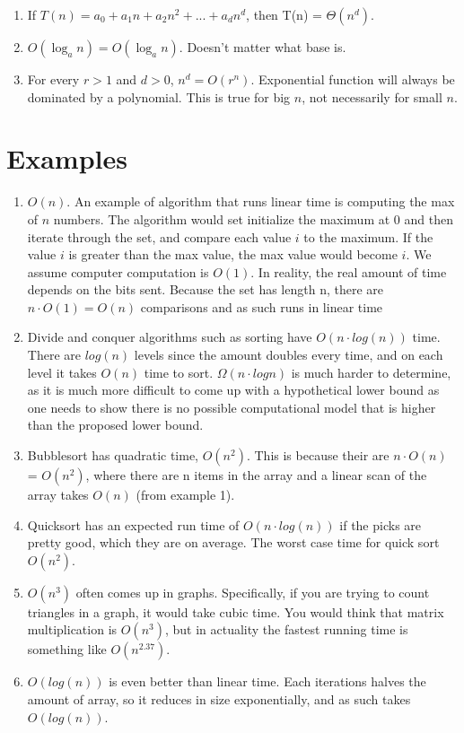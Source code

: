 \begin{enumerate}
  \item If $T(n)  = a_{0} + a_{1}n + a_{2}n^{2} + ... + a_{d}n^{d}$, then T(n) = $\Theta (n^{d})$.
  \item $O(\log_a n) = O(\log_a n)$. Doesn't matter what base is.
  \item For every $r>1$ and $d>0$, $n^{d} = O(r^{n})$. Exponential function will always be dominated by a polynomial. This is true for big $n$, not necessarily for small $n$.
\end{enumerate}

\section{Examples}


\begin{enumerate}
  \item $O(n)$. An example of algorithm that runs linear time is computing the max of $n$ numbers. The algorithm would set initialize the maximum at 0 and then iterate through the set, and compare each value $i$ to the maximum. If the value $i$ is greater than the max value, the max value would become $i$. We assume computer computation is $O(1)$. In reality, the real amount of time depends on the bits sent. Because the set has length n, there are $n \cdot O(1) = O(n)$ comparisons and as such runs in linear time
  
  \item Divide and conquer algorithms such as sorting have $O(n \cdot log (n))$ time. There are $log (n)$ levels since the amount doubles every time, and on each level it takes $O(n)$ time to sort. $\Omega(n \cdot log n)$ is much harder to determine, as it is much more difficult to come up with a hypothetical lower bound as one needs to show there is no possible computational model that is higher than the proposed lower bound.  
  
  \item Bubblesort has quadratic time, $O(n^{2})$. This is because their are $n \cdot O(n)$ = $O(n^{2})$, where there are n items in the array and a linear scan of the array takes $O(n)$ (from example 1). 
  
   \item Quicksort has an expected run time of $O(n \cdot log (n))$ if the picks are pretty good, which they are on average. The worst case time for quick sort  $O(n^{2})$.
   
   \item $O(n^{3})$ often comes up in graphs. Specifically, if you are trying to count triangles in a graph, it would take cubic time. You would think that matrix multiplication is $O(n^{3})$, but in actuality the fastest running time is something like $O(n^{2.37})$. 
   
   \item $O(log(n))$ is even better than linear time. Each iterations halves the amount of array, so it reduces in size exponentially, and as such takes $O(log(n))$.
  
\end{enumerate}


